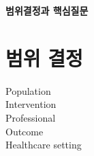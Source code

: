 \documentclass{paper}
\begin{document}
\Large \textbf{범위결정과 핵심질문} \normalsize

\section{범위 결정}
\begin{description}
	\item[Population]
	\item[Intervention]
	\item[Professional]
	\item[Outcome]
	\item[Healthcare setting]
\end{description}

 
\end{document}
